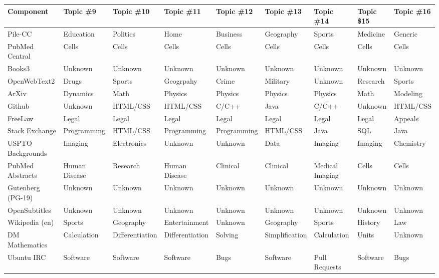 \documentclass[11pt,a4paper]{article}
\begin{document}
\begin{appendices}
\begin{table}[htb]
\begin{tiny}
\begin{tabular}{|p{}|p{}p{}p{}p{}p{}p{}p{}p{}|}
\hline
Component & Topic \#9 & Topic \#10 & Topic \#11 & Topic \#12 & Topic \#13 & Topic \#14 & Topic \$15 & Topic \#16\\\hline
Pile-CC & Education & Politics & Home & Business & Geography & Sports & Medicine & Generic\\\hline
    PubMed Central & Cells & Cells & Cells & Cells & Cells & Cells & Cells & Cells\\\hline
    Books3 & Unknown & Unknown & Unknown & Unknown & Unknown & Unknown & Unknown & Unknown\\\hline
    OpenWebText2 & Drugs & Sports & Geogrpahy & Crime & Military & Unknown & Research & Sports\\\hline
    ArXiv & Dynamics & Math & Physics & Physics & Physics & Physics & Math & Modeling\\\hline
    Github & Unknown & HTML/CSS & HTML/CSS & C/C++ & Java & C/C++ & Unknown & HTML/CSS\\\hline
    FreeLaw & Legal & Legal & Legal & Legal & Legal & Legal & Legal & Appeals\\\hline
    Stack Exchange & Programming & HTML/CSS & Programming & Programming & HTML/CSS & Java & SQL & Java\\\hline
    USPTO Backgrounds & Imaging & Electronics & Unknown & Unknown & Data & Imaging & Imaging & Chemistry\\\hline
    PubMed Abstracts & Human Disease & Research & Human Disease & Clinical & Clinical & Medical Imaging & Cells & Cells\\\hline
    Gutenberg (PG-19) & Unknown & Unknown & Unknown & Unknown & Unknown & Unknown & Unknown & Unknown\\\hline
    OpenSubtitles & Unknown & Unknown & Unknown & Unknown & Unknown & Unknown & Unknown & Unknown\\\hline
    Wikipedia (en) & Sports & Geography & Entertainment & Unknown & Geography & Sports & History & Law\\\hline
    DM Mathematics & Calculation & Differentiation & Differentiation & Solving & Simplification & Calculation & Units & Unknown\\\hline
    Ubuntu IRC & Software & Software & Software & Bugs & Software & Pull Requests & Software & Bugs\\\hline

\end{tabular}
\end{tiny}
\end{table}
\end{appendices}
\end{document}
